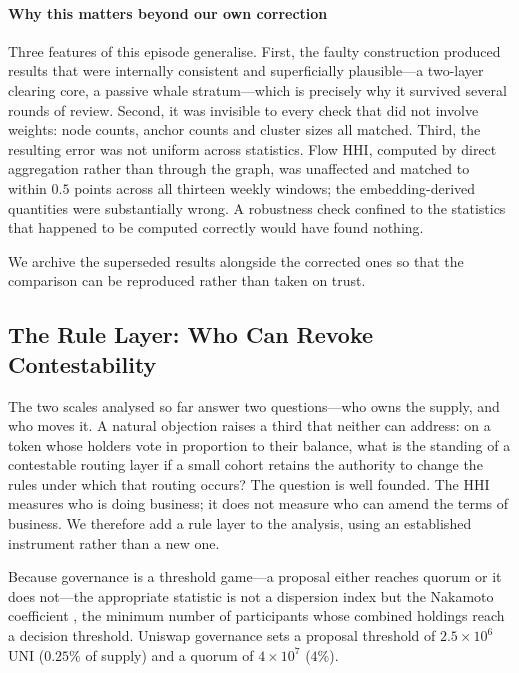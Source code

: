 \documentclass[final,5p,times]{elsarticle}
\begin{document}
\paragraph{Why this matters beyond our own correction}
Three features of this episode generalise. First, the faulty construction
produced results that were internally consistent and superficially
plausible---a two-layer clearing core, a passive whale stratum---which is
precisely why it survived several rounds of review. Second, it was invisible
to every check that did not involve weights: node counts, anchor counts and
cluster sizes all matched. Third, the resulting error was not uniform across
statistics. Flow HHI, computed by direct aggregation rather than through the
graph, was unaffected and matched to within $0.5$ points across all thirteen
weekly windows; the embedding-derived quantities were substantially wrong.
A robustness check confined to the statistics that happened to be computed
correctly would have found nothing.

We archive the superseded results alongside the corrected ones so that the
comparison can be reproduced rather than taken on trust.

\subsection{The Rule Layer: Who Can Revoke Contestability}
\label{sec:governance}
The two scales analysed so far answer two questions---who owns the supply,
and who moves it. A natural objection raises a third that neither
can address: on a token whose holders vote in proportion to their balance,
what is the standing of a contestable routing layer if a small cohort retains
the authority to change the rules under which that routing occurs? The
question is well founded. The HHI measures who is doing business; it does
not measure who can amend the terms of business. We therefore add a rule
layer to the analysis, using an established instrument rather than a new one.

Because governance is a threshold game---a proposal either reaches quorum or
it does not---the appropriate statistic is not a dispersion index but the
Nakamoto coefficient \cite{grajales2022measuring}, the minimum number of
participants whose combined holdings reach a decision threshold. Uniswap
governance sets a proposal threshold of $2.5\times10^6$ UNI ($0.25\%$ of
supply) and a quorum of $4\times10^7$ ($4\%$).
\end{document}
